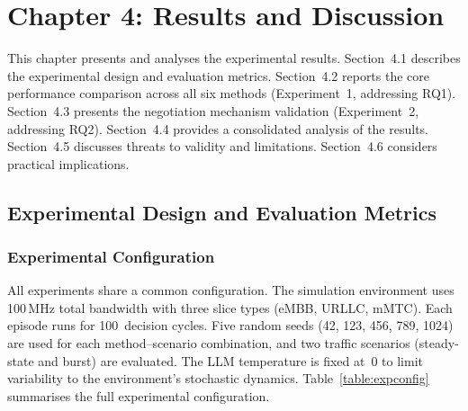 \section*{Chapter 4: Results and Discussion}
\setcounter{section}{4} \setcounter{subsection}{0}
 {}

This chapter presents and analyses the experimental results. Section~4.1 describes the experimental design and evaluation metrics. Section~4.2 reports the core performance comparison across all six methods (Experiment~1, addressing RQ1). Section~4.3 presents the negotiation mechanism validation (Experiment~2, addressing RQ2). Section~4.4 provides a consolidated analysis of the results. Section~4.5 discusses threats to validity and limitations. Section~4.6 considers practical implications.

\subsection{Experimental Design and Evaluation Metrics}

\subsubsection{Experimental Configuration}

All experiments share a common configuration. The simulation environment uses 100\,MHz total bandwidth with three slice types (eMBB, URLLC, mMTC). Each episode runs for 100~decision cycles. Five random seeds (42, 123, 456, 789, 1024) are used for each method--scenario combination, and two traffic scenarios (steady-state and burst) are evaluated. The LLM temperature is fixed at~0 to limit variability to the environment's stochastic dynamics. Table~\ref{table:expconfig} summarises the full experimental configuration.

